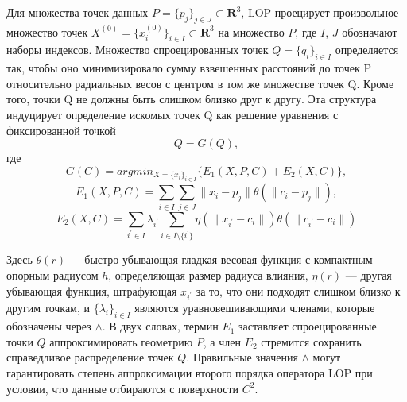 Для множества точек данных $P = \{p_j\}_{j\in J} \subset \mathbf R^{3}$, LOP проецирует произвольное множество точек $X^{(0)} = \{x_i^{(0)} \} _{i \in I} \subset \mathbf R^{3}$ на множество $P$, где $I$, $J$ обозначают наборы индексов. Множество спроецированных точек $Q = \{q_i\}_{i\in I}$ определяется так, чтобы оно минимизировало сумму взвешенных расстояний до точек P относительно радиальных весов с центром в том же множестве точек Q. Кроме того, точки Q не должны быть слишком близко друг к другу. Эта структура индуцирует определение искомых точек Q как решение уравнения с фиксированной точкой 
$$Q = G(Q),$$
где
$$G(C) = argmin_{X = \{x_i\}_{i \in I}} \{E_1(X,P,C) + E_2(X,C)\},$$
$$E_1(X,P,C) = \sum_{i \in I} \sum_{j \in J}\parallel x_i - p_j \parallel \theta(\parallel c_i - p_j \parallel), $$ 
$$E_2(X, C) = \sum _{i^{'} \in I} \lambda_{i^{'}}\sum_{i \in I \setminus\{i^{'}\}} \eta(\parallel x_{i^{'}}- c_i  \parallel)\theta(\parallel c_{i^{'}} - c_i \parallel)$$

Здесь $\theta(r)$ — быстро убывающая гладкая весовая функция с компактным опорным радиусом $h$, определяющая размер радиуса влияния, $\eta(r)$ — другая убывающая функция, штрафующая $x_{i^{'}}$ за то, что они подходят слишком близко к другим точкам, и $\{\lambda_i\}_{i \in I}$ являются уравновешивающими членами, которые обозначены через $\mathbf \land$. В двух словах, термин $E_1$ заставляет спроецированные точки $Q$ аппроксимировать геометрию $P$, а член $E_2$ стремится  сохранить справедливое распределение точек $Q$. Правильные значения $\mathbf\land$ могут гарантировать степень аппроксимации второго порядка оператора LOP при условии, что данные отбираются с поверхности $C^{2}$.

